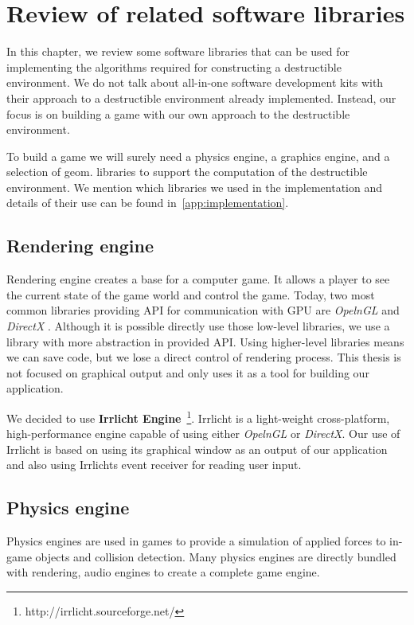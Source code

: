 \chapter{Review of related software libraries}
\label{chapt:technology}
In this chapter, we review some software libraries that can be used for implementing the algorithms required for constructing a destructible environment. We do not talk about all-in-one software development kits with their approach to a destructible environment already implemented. Instead, our focus is on building a game with our own approach to the destructible environment. 

To build a game we will surely need a physics engine, a graphics engine, and a selection of geom. libraries to support the computation of the destructible environment. We mention which libraries we used in the implementation and details of their use can be found in~\cref{app:implementation}.

\section{Rendering engine}
Rendering engine creates a base for a computer game. It allows a player to see the current state of the game world and control the game.  Today, two most common libraries providing API for communication with GPU are \emph{OpelnGL} and \emph{DirectX} . Although it is possible directly use those low-level libraries, we use a library with more abstraction in provided API. Using higher-level libraries means we can save code, but we lose a direct control of rendering process. This thesis is not focused on graphical output and only uses it as a tool for building our application.

We decided to use \textbf{Irrlicht Engine}~\footnote{http://irrlicht.sourceforge.net/}. Irrlicht is a light-weight cross-platform, high-performance engine capable of using either  \emph{OpelnGL} or \emph{DirectX}. Our use of Irrlicht is based on using its graphical window as an output of our application and also using Irrlichts event receiver for reading user input.

\section{Physics engine}
Physics engines are used in games to provide a simulation of applied forces to in-game objects and collision detection. Many physics engines are directly bundled with rendering, audio engines to create a complete game engine. 

